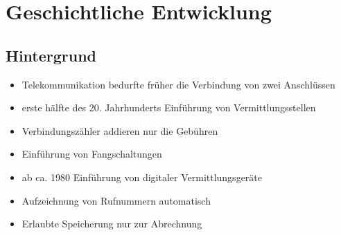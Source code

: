 
\section{Geschichtliche Entwicklung}
  \subsection{Hintergrund}
    \begin{frame}
      \begin{itemize}
        \item
          Telekommunikation bedurfte früher die Verbindung von zwei Anschlüssen
        \item
          erste hälfte des 20. Jahrhunderts Einführung von Vermittlungsstellen
        \item
          Verbindungszähler addieren nur die Gebühren
        \item
          Einführung von Fangschaltungen
        \item 
         ab ca. 1980 Einführung von digitaler Vermittlungsgeräte
        \item
          Aufzeichnung von Rufnummern automatisch
        \item
          Erlaubte Speicherung nur zur Abrechnung


      \end{itemize}
    \end{frame}

